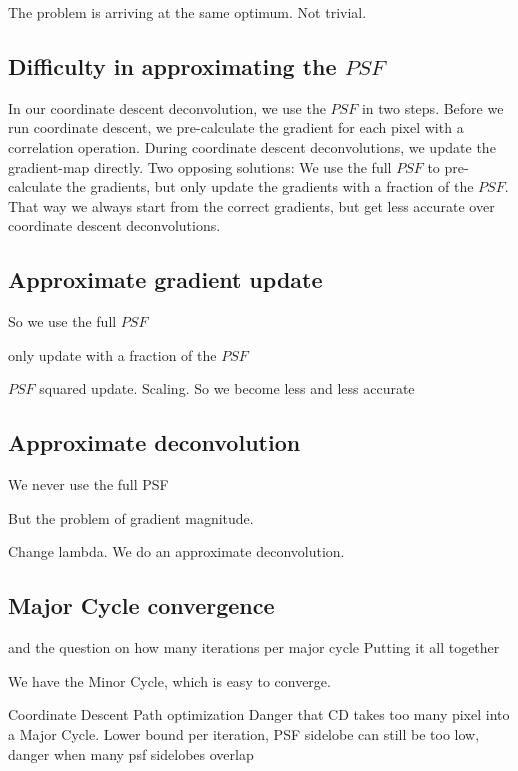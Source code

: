 The problem is arriving at the same optimum. Not trivial.



\subsection{Difficulty in approximating the $PSF$}

In our coordinate descent deconvolution, we use the $PSF$ in two steps. Before we run coordinate descent, we pre-calculate the gradient for each pixel with a correlation operation. During coordinate descent deconvolutions, we update the gradient-map directly. Two opposing solutions: We use the full $PSF$ to pre-calculate the gradients, but only update the gradients with a fraction of the $PSF$. That way we always start from the correct gradients, but get less accurate over coordinate descent deconvolutions.

\subsection{Approximate gradient update}

So we use the full $PSF$

only update with a fraction of the $PSF$

$PSF$ squared update. Scaling.
So we become less and less accurate


\subsection{Approximate deconvolution}

We never use the full PSF

But the problem of gradient magnitude. 

Change lambda. We do an approximate deconvolution. 


\subsection{Major Cycle convergence}\label{gradients:pathreg}
\cite{clark1980efficient} and the question on how many iterations per major cycle
Putting it all together

We have the Minor Cycle, which is easy to converge.

Coordinate Descent Path optimization \cite{friedman2010regularization}
Danger that CD takes too many pixel into a Major Cycle. Lower bound per iteration, PSF sidelobe
can still be too low, danger when many psf sidelobes overlap